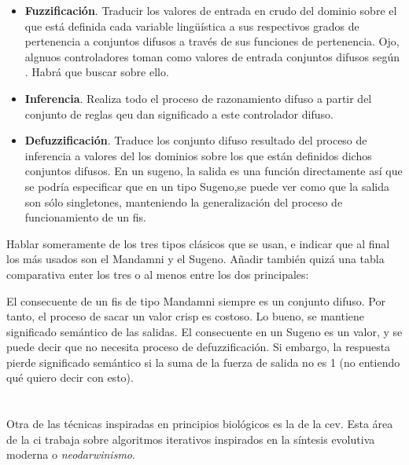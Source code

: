 \begin{itemize}
	\item \textbf{Fuzzificación}. Traducir los valores de entrada en crudo del dominio sobre el que está definida cada variable lingüística a sus respectivos grados de pertenencia a conjuntos difusos a través de sus funciones de pertenencia. \TODO Ojo, algnuos controladores toman como valores de entrada conjuntos difusos según \cite{Ma}. Habrá que buscar sobre ello.
	\item \textbf{Inferencia}. Realiza todo el proceso de razonamiento difuso a partir del conjunto de reglas qeu dan significado a este controlador difuso.
	\item \textbf{Defuzzificación}. Traduce los conjunto difuso resultado del proceso de inferencia a valores del los dominios sobre los que están definidos dichos conjuntos difusos. \TODO En un sugeno, la salida es una función directamente así que se podría especificar que en un tipo Sugeno,se puede ver como que la salida son sólo singletones, manteniendo la generalización del proceso de funcionamiento de un \ac{fis}.
\end{itemize}

Hablar someramente de los tres tipos clásicos que se usan, e indicar que al final los más usados son el Mandamni y el Sugeno. Añadir también quizá una tabla comparativa enter los tres o al menos entre los dos principales:

El consecuente de un \ac{fis} de tipo Mandamni siempre es un conjunto difuso. Por tanto, el proceso de sacar un valor crisp es costoso. Lo bueno, se mantiene significado semántico de las salidas. El consecuente en un Sugeno es un valor, y se puede decir que no necesita proceso de defuzzificación. Si embargo, la respuesta pierde significado semántico si la suma de la fuerza de salida no es 1 (no entiendo qué quiero decir con esto).

\section{}

Otra de las técnicas inspiradas en principios biológicos es la de la \gls{cev}. Esta área de la \gls{ci} trabaja sobre algoritmos iterativos inspirados en la síntesis evolutiva moderna o \textit{neodarwinismo}.

